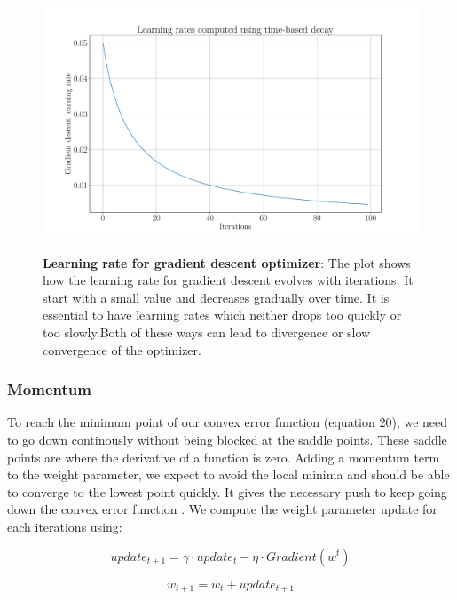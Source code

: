\begin{figure}[h]
\begin{centering}
    {\includegraphics[scale=0.33]{figures/Learning_rates.pdf}}
    \caption[Learning rates]{\textbf{Learning rate for gradient descent optimizer}: The plot shows how the learning rate for gradient descent evolves with iterations. It start with a small value and decreases gradually over time. It is essential to have learning rates which neither drops too quickly or too slowly.Both of these ways can lead to divergence or slow convergence of the optimizer.}
\end{centering}
\end{figure}


\subsubsection{Momentum}
To reach the minimum point of our convex error function (equation 20), we need to go down continously without being blocked at the saddle points. These saddle points are where the derivative of a function is zero. Adding a momentum term to the weight parameter, we expect to avoid the local minima and should be able to converge to the lowest point quickly. It gives the necessary push to keep going down the convex error function \cite{articleRuderS, Sutskever}. We compute the weight parameter update for each iterations using:

\begin{equation}
update_{t+1} = \gamma \cdot update_{t} - \eta \cdot Gradient(w^t)
\end{equation}

\begin{equation}
w_{t+1} = w_t + update_{t+1}
\end{equation}

